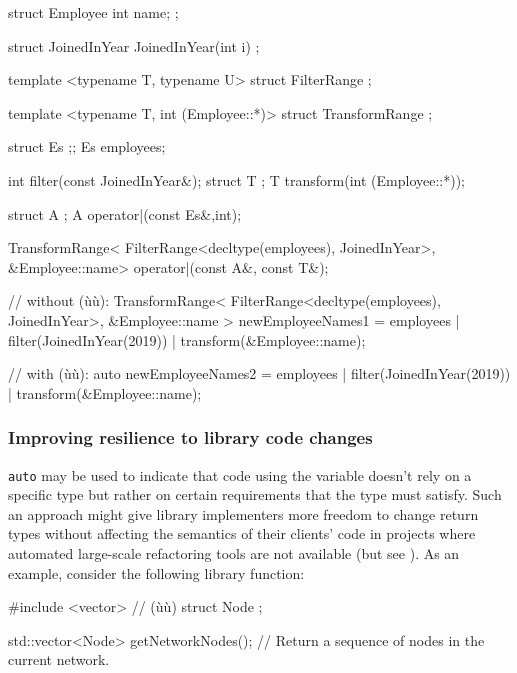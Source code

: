 \begin{emcppshiddenlisting}[emcppsbatch=e10]
struct Employee {
  int name;
};

struct JoinedInYear {
JoinedInYear(int i) {}
};

template <typename T, typename U>
struct FilterRange {};

template <typename T, int (Employee::*)>
struct TransformRange {};

struct Es {};;
Es employees;

int filter(const JoinedInYear&);
struct T {};
T transform(int (Employee::*));

struct A {};
A operator|(const Es&,int);

TransformRange<
    FilterRange<decltype(employees), JoinedInYear>,
    &Employee::name>
operator|(const A&, const T&);

\end{emcppshiddenlisting}
\begin{emcppslisting}[emcppsbatch=e10]
// without (ù{}ù):
TransformRange<
    FilterRange<decltype(employees), JoinedInYear>,
    &Employee::name
> newEmployeeNames1 =
    employees | filter(JoinedInYear(2019))
              | transform(&Employee::name);

// with (ù{}ù):
auto newEmployeeNames2 =
    employees | filter(JoinedInYear(2019))
              | transform(&Employee::name);
\end{emcppslisting}
    

\subsubsection[Improving resilience to library code changes]{Improving resilience to library code changes}\label{improving-resilience-to-library-code-changes}

\lstinline!auto! may be used to indicate that code using the variable
doesn't rely on a specific type but rather on certain requirements that
the type must satisfy. Such an approach might give library implementers
more freedom to change return types without affecting the semantics of
their clients' code in projects where automated large-scale refactoring
tools are not available (but see ). As an example,
consider the following library function:

\begin{emcppshiddenlisting}[emcppsbatch=e11]
#include <vector>     // (ù{}ù)
struct Node {};
\end{emcppshiddenlisting}
\begin{emcppslisting}[emcppsbatch=e11]
std::vector<Node> getNetworkNodes();
    // Return a sequence of nodes in the current network.
\end{emcppslisting}
    
